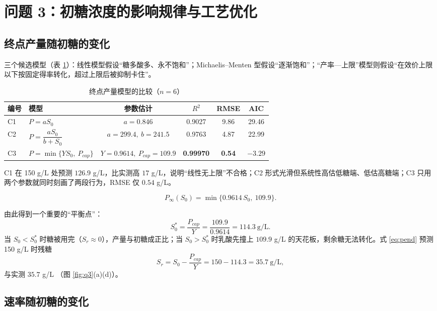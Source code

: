 \section{问题 3：初糖浓度的影响规律与工艺优化}

\subsection{终点产量随初糖的变化}

三个候选模型（表 \ref{tab:q3end}）：线性模型假设“糖多酸多、永不饱和”；Michaelis--Menten 型假设“逐渐饱和”；“产率—上限”模型则假设“在效价上限以下按固定得率转化，超过上限后被抑制卡住”。

\begin{table}[H]
\centering
\caption{终点产量模型的比较（$n=6$）}
\label{tab:q3end}
\small
\begin{tabular}{llcccc}
\toprule
编号 & 模型 & 参数估计 & $R^2$ & RMSE & AIC \\
\midrule
C1 & $P=aS_0$ & $a=0.846$ & 0.9027 & 9.86 & 29.46 \\
C2 & $P=\dfrac{aS_0}{b+S_0}$ & $a=299.4,\ b=241.5$ & 0.9763 & 4.87 & 22.99 \\
C3 & $P=\min\{YS_0,\ P_{cap}\}$ & $Y=0.9614,\ P_{cap}=109.9$ & \textbf{0.99970} & \textbf{0.54} & $\mathbf{-3.29}$ \\
\bottomrule
\end{tabular}
\end{table}

C1 在 150 g/L 处预测 $126.9$ g/L，比实测高 $17$ g/L，说明“线性无上限”不合格；C2 形式光滑但系统性高估低糖端、低估高糖端；C3 只用两个参数就同时刻画了两段行为，RMSE 仅 $0.54$ g/L。

\begin{equation}
P_\infty(S_0)=\min\{0.9614\,S_0,\ 109.9\}.
\label{eq:pend}
\end{equation}

由此得到一个重要的“平衡点”：
\begin{equation}
S_0^*=\frac{P_{cap}}{Y}=\frac{109.9}{0.9614}=114.3\ \mathrm{g/L}.
\label{eq:s0star}
\end{equation}
当 $S_0<S_0^*$ 时糖被用完（$S_r\approx0$），产量与初糖成正比；当 $S_0>S_0^*$ 时乳酸先撞上 $109.9$ g/L 的天花板，剩余糖无法转化。式 \eqref{eq:pend} 预测 150 g/L 时残糖
$$S_r=S_0-\frac{P_{cap}}{Y}=150-114.3=35.7\ \mathrm{g/L},$$
与实测 $35.7$ g/L （图 \ref{fig:q3}(a)(d)）。

\subsection{速率随初糖的变化}

